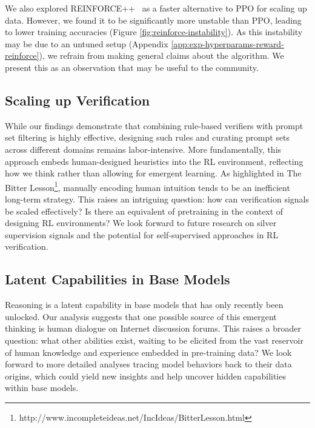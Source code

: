 We also explored REINFORCE++~\cite{hu2025reinforce++} as a faster alternative to PPO for scaling up data. However, we found it to be significantly more unstable than PPO, leading to lower training accuracies (Figure \ref{fig:reinforce-instability}). As this instability may be due to an untuned setup (Appendix \ref{app:exp-hyperparams-reward-reinforce}), we refrain from making general claims about the algorithm. We present this as an observation that may be useful to the community.

\subsection{Scaling up Verification}

While our findings demonstrate that combining rule-based verifiers with prompt set filtering is highly effective, designing such rules and curating prompt sets across different domains remains labor-intensive. More fundamentally, this approach embeds human-designed heuristics into the RL environment, reflecting how we think rather than allowing for emergent learning. As highlighted in The Bitter Lesson\footnote{http://www.incompleteideas.net/IncIdeas/BitterLesson.html}, manually encoding human intuition tends to be an inefficient long-term strategy. This raises an intriguing question: how can verification signals be scaled effectively? Is there an equivalent of pretraining in the context of designing RL environments? We look forward to future research on silver supervision signals and the potential for self-supervised approaches in RL verification.

\subsection{Latent Capabilities in Base Models}

Reasoning is a latent capability in base models that has only recently been unlocked. Our analysis suggests that one possible source of this emergent thinking is human dialogue on Internet discussion forums. This raises a broader question: what other abilities exist, waiting to be elicited from the vast reservoir of human knowledge and experience embedded in pre-training data? We look forward to more detailed analyses tracing model behaviors back to their data origins, which could yield new insights and help uncover hidden capabilities within base models.